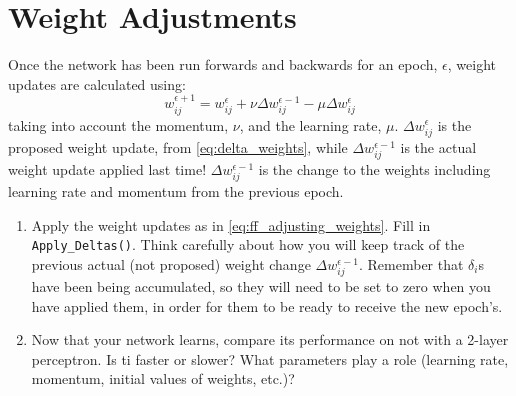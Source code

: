 \documentclass[a4paper,10pt]{article}
\begin{document}
\section{Weight Adjustments}
Once the network has been run forwards and backwards for an epoch, $\epsilon$, weight updates are calculated using:
\begin{equation}
\label{eq:ff_adjusting_weights}
w_{ij}^{\epsilon +1} = w_{ij}^{\epsilon} +  \nu \Delta w_{ij}^{\epsilon - 1}  - \mu \Delta w_{ij}^{\epsilon}
\end{equation}
taking into account the momentum, $\nu$, and the learning rate, $\mu$.  $\Delta w_{ij}^{\epsilon}$ is the proposed weight update, from \autoref{eq:delta_weights}, while $\Delta w_{ij}^{\epsilon - 1}$  is the actual weight update applied last time! $\Delta w_{ij}^{\epsilon - 1}$ is the change to the weights including learning rate and momentum from the previous epoch.

\begin{enumerate}

\item Apply the weight updates as in \autoref{eq:ff_adjusting_weights}. Fill in \texttt{Apply\_Deltas()}. Think carefully about how you will keep track of the previous actual (not proposed) weight change $\Delta w_{ij}^{\epsilon-1}$. Remember that $\delta_i$s have been being accumulated, so they will need to be set to zero when you have applied them, in order for them to be ready to receive the new epoch's.

\item Now  that your network learns, compare its performance on not with a 2-layer perceptron. Is ti faster or slower? What parameters play a role (learning rate, momentum, initial values of weights, etc.)? 



 
 \end{enumerate}

\end{document}
